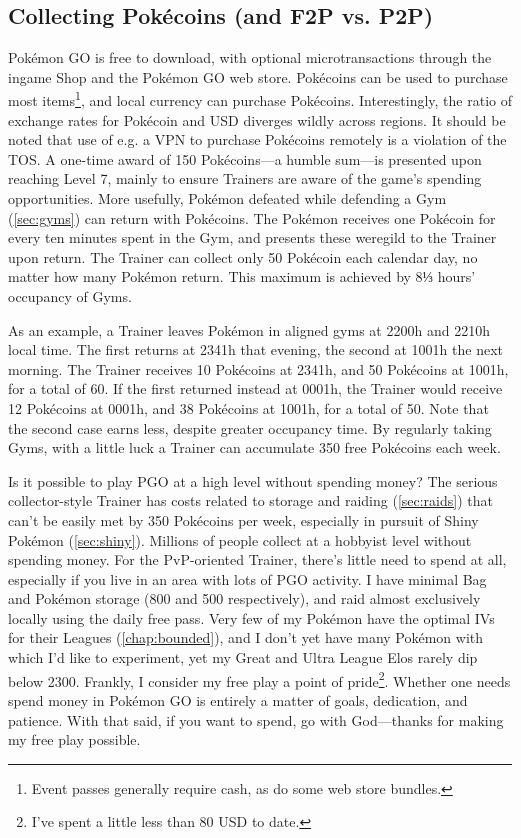 \subsection{Collecting Pokécoins (and F2P vs. P2P)}
\label{subsec:getcoins}
Pokémon GO is free to download, with optional microtransactions through the ingame
  Shop and the Pokémon GO web store.
Pokécoins can be used to purchase most items\footnote{Event passes generally require cash,
  as do some web store bundles.}, and local currency can purchase Pokécoins.
Interestingly, the ratio of exchange rates for Pokécoin and USD diverges
  wildly across regions.
It should be noted that use of e.g. a VPN to purchase Pokécoins remotely is a
  violation of the TOS.
A one-time award of 150 Pokécoins---a humble sum---is presented upon reaching Level 7,
  mainly to ensure Trainers are aware of the game's spending opportunities.
More usefully, Pokémon defeated while defending a Gym (\autoref{sec:gyms}) can
  return with Pokécoins.
The Pokémon receives one Pokécoin for every ten minutes spent in the Gym,
  and presents these weregild to the Trainer upon return.
The Trainer can collect only 50 Pokécoin each calendar day, no matter how many Pokémon return.
This maximum is achieved by 8⅓ hours' occupancy of Gyms.

As an example, a Trainer leaves Pokémon in aligned gyms at 2200h and 2210h local time.
The first returns at 2341h that evening, the second at 1001h the next morning.
The Trainer receives 10 Pokécoins at 2341h, and 50 Pokécoins at 1001h, for a total of 60.
If the first returned instead at 0001h, the Trainer would receive 12 Pokécoins at 0001h,
  and 38 Pokécoins at 1001h, for a total of 50.
Note that the second case earns less, despite greater occupancy time.
By regularly taking Gyms, with a little luck a Trainer can accumulate 350 free Pokécoins each week.

Is it possible to play PGO at a high level without spending money?
The serious collector-style Trainer has costs related to storage and raiding (\autoref{sec:raids})
  that can't be easily met by 350 Pokécoins per week, especially
  in pursuit of Shiny Pokémon (\autoref{sec:shiny}).
Millions of people collect at a hobbyist level without spending money.
For the PvP-oriented Trainer, there's little need to spend at all,
  especially if you live in an area with lots of PGO activity.
I have minimal Bag and Pokémon storage (800 and 500 respectively), and raid almost exclusively locally using the daily free pass.
Very few of my Pokémon have the optimal IVs for their Leagues (\autoref{chap:bounded}),
  and I don't yet have many Pokémon with which I'd like to experiment,
  yet my Great and Ultra League Elos rarely dip below 2300.
Frankly, I consider my free play a point of pride\footnote{I've spent a little less than 80 USD to date.}.
Whether one needs spend money in Pokémon GO is entirely a matter of goals, dedication, and patience.
With that said, if you want to spend, go with God---thanks for making my free play possible.

